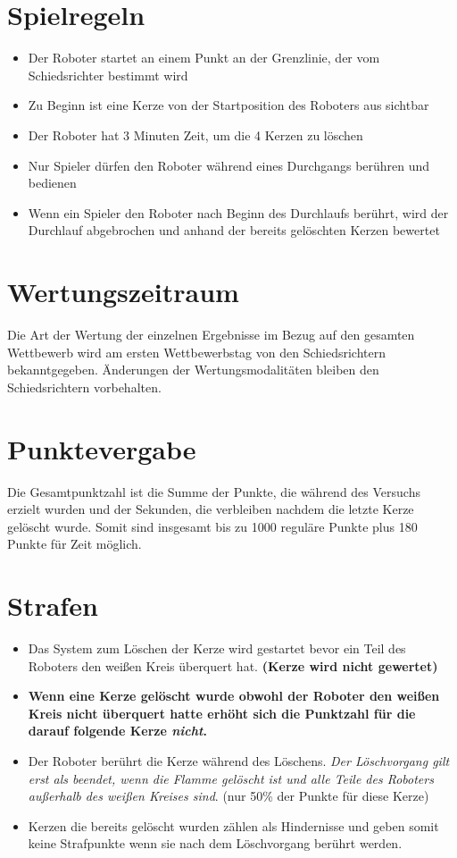 \documentclass[a4paper,12pt]{article}
\begin{document}
\section{Spielregeln}
\begin{itemize}
	\item Der Roboter startet an einem Punkt an der Grenzlinie, der vom Schiedsrichter bestimmt wird
	\item Zu Beginn ist eine Kerze von der Startposition des Roboters aus sichtbar
	\item Der Roboter hat 3 Minuten Zeit, um die 4 Kerzen zu löschen
	\item Nur Spieler dürfen den Roboter während eines Durchgangs berühren und bedienen
	\item Wenn ein Spieler den Roboter nach Beginn des Durchlaufs berührt, wird der Durchlauf abgebrochen und
	anhand der bereits gelöschten Kerzen bewertet
\end{itemize}
\section{Wertungszeitraum}
Die Art der Wertung der einzelnen Ergebnisse im Bezug auf den gesamten Wettbewerb wird am ersten Wettbewerbstag von den Schiedsrichtern bekanntgegeben. Änderungen der Wertungsmodalitäten bleiben den Schiedsrichtern vorbehalten.
\section{Punktevergabe}
Die Gesamtpunktzahl ist die Summe der Punkte, die während des Versuchs erzielt wurden und der
Sekunden, die verbleiben nachdem die letzte Kerze gelöscht wurde. Somit sind insgesamt bis zu 1000 reguläre Punkte plus 180 Punkte für Zeit möglich.

\section{Strafen}
\begin{itemize}
\item Das System zum Löschen der Kerze wird gestartet bevor ein Teil des Roboters den weißen Kreis überquert
hat. \textbf{(Kerze wird nicht gewertet)}
\item \textbf{Wenn eine Kerze gelöscht wurde obwohl der Roboter den weißen Kreis nicht überquert hatte erhöht sich die Punktzahl für die darauf folgende Kerze \emph{nicht}.}
\item Der Roboter berührt die Kerze während des Löschens. \emph{Der Löschvorgang gilt erst als beendet, wenn die
Flamme gelöscht ist und alle Teile des Roboters außerhalb des weißen Kreises sind}. (nur 50\% der Punkte für diese Kerze)
\item Kerzen die bereits gelöscht wurden zählen als Hindernisse und geben somit keine Strafpunkte wenn sie nach
dem Löschvorgang berührt werden.
\end{itemize}
\end{document}
